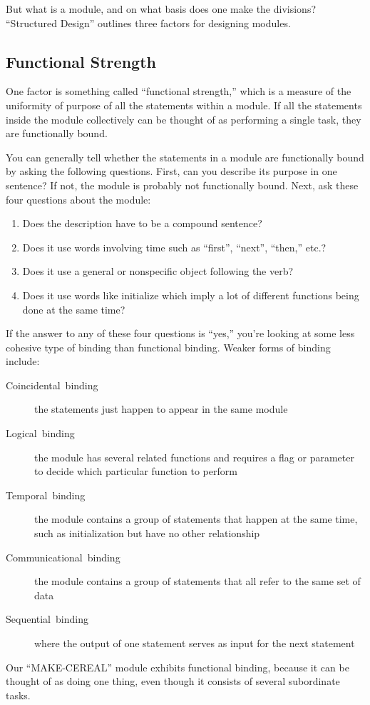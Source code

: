But what is a module, and on what basis does one make the divisions?
{}``Structured Design'' outlines three factors for designing modules.


\subsection*{Functional Strength}

One factor is something called {}``functional strength,'' which
is a measure of the uniformity of purpose of all the statements within
a module. If all the statements inside the module collectively can
be thought of as performing a single task, they are functionally bound.

You can generally tell whether the statements in a module are functionally
bound by asking the following questions. First, can you describe its
purpose in one sentence? If not, the module is probably not functionally
bound. Next, ask these four questions about the module:

\begin{enumerate}
\item Does the description have to be a compound sentence?
\item Does it use words involving time such as {}``first'', {}``next'',
{}``then,'' etc.?
\item Does it use a general or nonspecific object following the verb?
\item Does it use words like initialize which imply a lot of different functions
being done at the same time?
\end{enumerate}
If the answer to any of these four questions is {}``yes,'' you're
looking at some less cohesive type of binding than functional binding.
Weaker forms of binding include:

\begin{description}
\item [Coincidental~binding]the statements just happen to appear in the
same module
\item [Logical~binding]the module has several related functions and requires
a flag or parameter to decide which particular function to perform
\item [Temporal~binding]the module contains a group of statements that
happen at the same time, such as initialization but have no other
relationship
\item [Communicational~binding]the module contains a group of statements
that all refer to the same set of data
\item [Sequential~binding]where the output of one statement serves as
input for the next statement
\end{description}
Our {}``MAKE-CEREAL'' module exhibits functional binding, because
it can be thought of as doing one thing, even though it consists of
several subordinate tasks.


